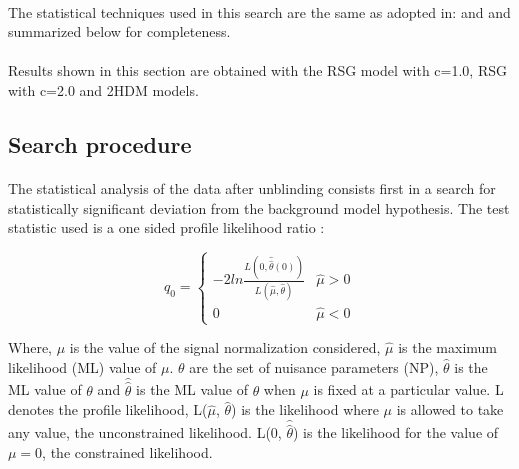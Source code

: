 \def\qmutilde{$\widetilde{q_{\mu}}$\xspace}
\def\muhat{$\hat{\mu}$\xspace}
\def\thetahat{$\hat{\theta}$\xspace}
\def\thetahathat{$\hat{\hat{\theta}}$\xspace}
\def\cls{$CL_{s}$\xspace}
\def\clsb{$CL_{s+b}$\xspace}
\def\clb{$CL_{b}$\xspace}

\paragraph{}
The statistical techniques used in this search are the same as adopted in: \cite{ATLASHHbbbb} and \cite{ATLAS-CONF-2016-017} and summarized below for completeness.

\paragraph{}
Results shown in this section are obtained with the RSG model with c=1.0, RSG with c=2.0 and 2HDM models.


\subsection{Search procedure}
\label{sec-search-procedure}
% 
%
\paragraph{}
The statistical analysis of the data after unblinding consists first in a search for statistically significant deviation from the background model hypothesis.  The test statistic used is a one sided profile likelihood ratio \cite{AsymLikelihood}:

\begin{equation}
  {q_{0}} =
  \begin{cases}
    -2ln \frac{L(0,\hat{\hat{\theta}}(0))}{L(\hat{\mu},\hat{\theta})} & \hat{\mu} > 0 \\
    0 & \hat{\mu} < 0
  \end{cases} 
\end{equation}

\noindent
Where, $\mu$ is the value of the signal normalization considered, \muhat is the maximum likelihood (ML)  value of $\mu$. $\theta$ are the set of nuisance parameters (NP), \thetahat is the ML value of $\theta$ and  \thetahathat is the ML value of $\theta$ when $\mu$ is fixed at a particular value. L denotes the profile likelihood, L(\muhat, \thetahat) is the likelihood where $\mu$ is allowed to take any value, the  unconstrained likelihood. L(0, \thetahathat) is the likelihood for the value of $\mu = 0$,  the constrained likelihood.

